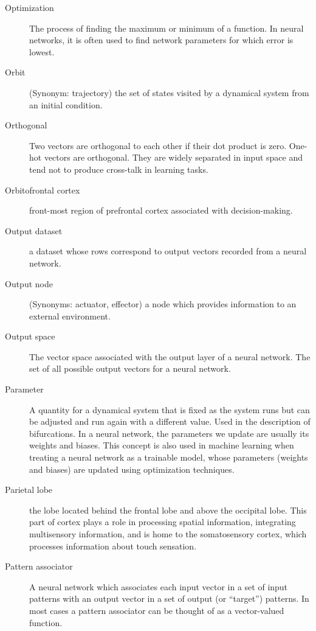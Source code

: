 \begin{description}
\item[Optimization] The process of finding the maximum or minimum of a function. In neural networks, it is often used to find network parameters for which error is lowest.

\item[Orbit] (Synonym: trajectory) the set of states visited by a dynamical system from an initial condition. 

\item[Orthogonal] Two vectors are orthogonal to each other if their dot product is zero. One-hot vectors are orthogonal. They are widely separated in input space and tend not to produce cross-talk in learning tasks.

\item[Orbitofrontal cortex] front-most region of prefrontal cortex associated with decision-making.

\item[Output dataset] a dataset whose rows correspond to output vectors recorded from a neural network. 

\item[Output node] (Synonyms: actuator, effector) a node which provides information to an external environment. 

\item[Output space] The vector space associated with the output layer of a neural network. The set of all possible output vectors for a neural network.

\item[Parameter] A quantity for a dynamical system that is fixed as the system runs but can be adjusted and run again with a different value. Used in the description of bifurcations. In a neural network, the parameters we  update are usually its weights and biases. This concept is also used in machine learning when treating a neural network as a trainable model, whose parameters (weights and biases) are updated using optimization techniques.

\item[Parietal lobe] the lobe located behind the frontal lobe and above the occipital lobe. This part of cortex plays a role in processing spatial information, integrating multisensory information, and is home to the somatosensory cortex, which processes information about touch sensation.

\item[Pattern associator] A neural network which associates each input vector in a set of input patterns with an output vector in a set of output (or ``target'') patterns. In most cases a pattern associator can be thought of as a vector-valued function. 
	

\end{description}
